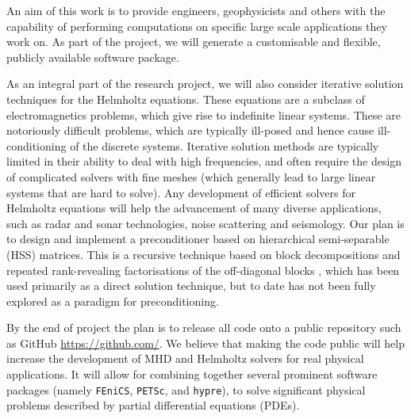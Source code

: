 \documentclass[12pt]{article}
\numberwithin{equation}{section}    %
\begin{document}
\smallskip

An aim of this work is to provide  engineers, geophysicists and others with the capability of performing computations on specific large scale applications they work on. As part of the project, we will generate a customisable and flexible, publicly available software package.
\smallskip

As an integral part of the research project, we will also consider iterative solution techniques for the Helmholtz equations. These equations are a subclass of electromagnetics problems, which give rise to indefinite linear systems. These are notoriously difficult problems, which are typically ill-posed and hence cause ill-conditioning of the discrete systems. Iterative solution methods are typically limited in their ability to deal with high frequencies, and often require the design of complicated solvers with fine meshes (which generally lead to large linear systems that are hard to solve). Any development of efficient solvers for Helmholtz equations will help the advancement of many diverse applications, such as radar and sonar technologies, noise scattering and seismology. Our plan is to design and implement a preconditioner based on hierarchical semi-separable (HSS) matrices. This is a recursive technique based on block decompositions and repeated rank-revealing factorisations of the off-diagonal blocks \cite{wang2011efficient}, which has been used primarily as a direct solution technique, but to date has not been fully explored as a paradigm for preconditioning.

\smallskip

By the end of project the plan is to release all code onto a public repository such as GitHub \url{https://github.com/}. We believe that making the code public will help increase the development of MHD and Helmholtz solvers for real physical applications. It will allow for combining together several prominent software packages (namely {\tt FEniCS}, {\tt PETSc}, and {\tt hypre}), to solve significant physical problems described by partial differential equations (PDEs).

\end{document}
